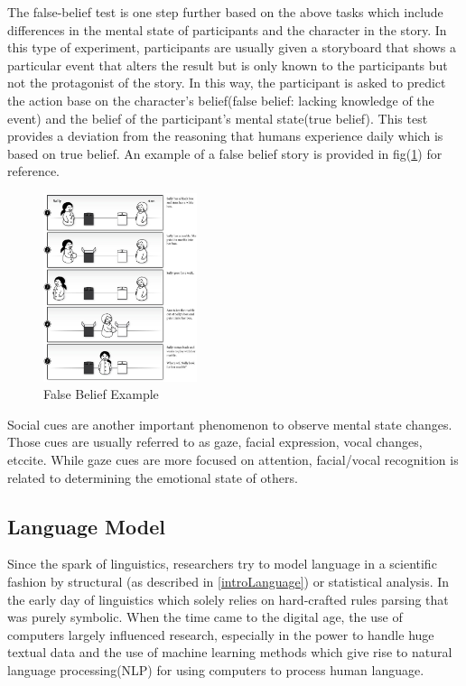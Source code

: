 \documentclass[12pt]{article}
\begin{document}
The false-belief test is one step further based on the above tasks which include differences in the mental state of participants and the character in the story\cite{Byom_2013}. In this type of experiment, participants are usually given a storyboard that shows a particular event that alters the result but is only known to the participants but not the protagonist of the story. In this way, the participant is asked to predict the action base on the character's belief(false belief: lacking knowledge of the event) and the belief of the participant's mental state(true belief). This test provides a deviation from the reasoning that humans experience daily which is based on true belief\cite{Byom_2013}. An example of a false belief story is provided in fig(\ref{fig:falseBelief}) for reference.
\begin{figure} [!h]
\begin{center}
\includegraphics[width=0.4\textwidth]{figures/false_belief_story.jpg}
\caption{False Belief Example \cite{Wimmer_1983}}
\label{fig:falseBelief}
\end{center}
\end{figure}
Social cues are another important phenomenon to observe mental state changes. Those cues are usually referred to as gaze, facial expression, vocal changes, etc{cite}. While gaze cues are more focused on attention, facial/vocal recognition is related to determining the emotional state of others. 



\subsection{Language Model} \label{introLM}
Since the spark of linguistics, researchers try to model language in a scientific fashion by structural (as described in \ref{introLanguage}) or statistical analysis. In the early day of linguistics which solely relies on hard-crafted rules parsing that was purely symbolic\cite{Nadkarni_2011}. When the time came to the digital age, the use of computers largely influenced research, especially in the power to handle huge textual data and the use of machine learning methods which give rise to natural language processing(NLP) for using computers to process human language.
\end{document}
